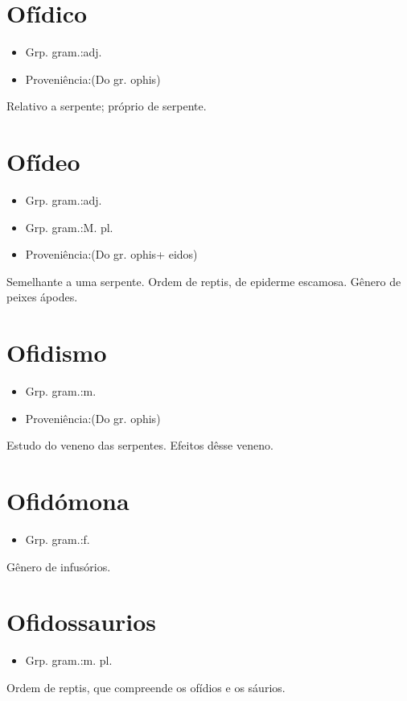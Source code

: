 \section{Ofídico}
\begin{itemize}
\item {Grp. gram.:adj.}
\end{itemize}
\begin{itemize}
\item {Proveniência:(Do gr. \textunderscore ophis\textunderscore )}
\end{itemize}
Relativo a serpente; próprio de serpente.
\section{Ofídeo}
\begin{itemize}
\item {Grp. gram.:adj.}
\end{itemize}
\begin{itemize}
\item {Grp. gram.:M. pl.}
\end{itemize}
\begin{itemize}
\item {Proveniência:(Do gr. \textunderscore ophis\textunderscore  + \textunderscore eidos\textunderscore )}
\end{itemize}
Semelhante a uma serpente.
Ordem de reptis, de epiderme escamosa.
Gênero de peixes ápodes.
\section{Ofidismo}
\begin{itemize}
\item {Grp. gram.:m.}
\end{itemize}
\begin{itemize}
\item {Proveniência:(Do gr. \textunderscore ophis\textunderscore )}
\end{itemize}
Estudo do veneno das serpentes.
Efeitos dêsse veneno.
\section{Ofidómona}
\begin{itemize}
\item {Grp. gram.:f.}
\end{itemize}
Gênero de infusórios.
\section{Ofidossaurios}
\begin{itemize}
\item {Grp. gram.:m. pl.}
\end{itemize}
Ordem de reptis, que compreende os ofídios e os sáurios.
